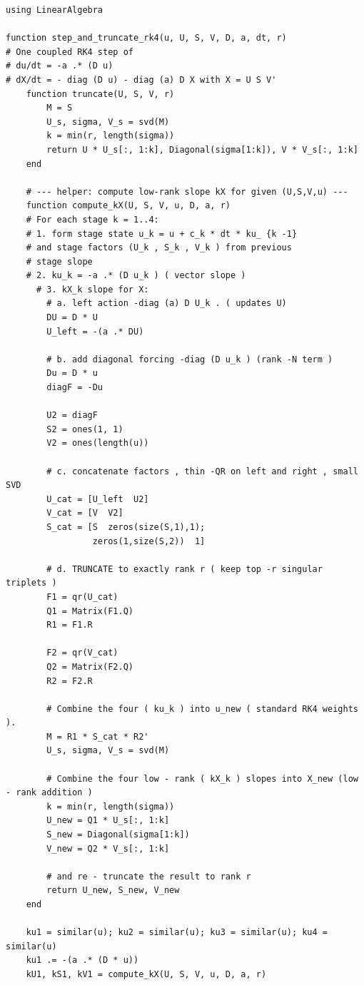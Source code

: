 \documentclass[11pt]{article}
\begin{document}
\begin{lstlisting}
using LinearAlgebra

function step_and_truncate_rk4(u, U, S, V, D, a, dt, r)
# One coupled RK4 step of
# du/dt = -a .* (D u)
# dX/dt = - diag (D u) - diag (a) D X with X = U S V'
    function truncate(U, S, V, r)
        M = S
        U_s, sigma, V_s = svd(M)
        k = min(r, length(sigma))
        return U * U_s[:, 1:k], Diagonal(sigma[1:k]), V * V_s[:, 1:k]
    end

    # --- helper: compute low-rank slope kX for given (U,S,V,u) ---
    function compute_kX(U, S, V, u, D, a, r)
    # For each stage k = 1..4:
    # 1. form stage state u_k = u + c_k * dt * ku_ {k -1}
    # and stage factors (U_k , S_k , V_k ) from previous
    # stage slope
    # 2. ku_k = -a .* (D u_k ) ( vector slope )
      # 3. kX_k slope for X:
        # a. left action -diag (a) D U_k . ( updates U)
        DU = D * U
        U_left = -(a .* DU)        

        # b. add diagonal forcing -diag (D u_k ) (rank -N term )
        Du = D * u                  
        diagF = -Du                 

        U2 = diagF                   
        S2 = ones(1, 1)         
        V2 = ones(length(u))      

        # c. concatenate factors , thin -QR on left and right , small SVD
        U_cat = [U_left  U2]         
        V_cat = [V  V2]              
        S_cat = [S  zeros(size(S,1),1);
                 zeros(1,size(S,2))  1]

        # d. TRUNCATE to exactly rank r ( keep top -r singular triplets )
        F1 = qr(U_cat)
        Q1 = Matrix(F1.Q)
        R1 = F1.R

        F2 = qr(V_cat)
        Q2 = Matrix(F2.Q)
        R2 = F2.R 

        # Combine the four ( ku_k ) into u_new ( standard RK4 weights ).
        M = R1 * S_cat * R2'
        U_s, sigma, V_s = svd(M)

        # Combine the four low - rank ( kX_k ) slopes into X_new (low - rank addition )
        k = min(r, length(sigma))
        U_new = Q1 * U_s[:, 1:k]
        S_new = Diagonal(sigma[1:k])
        V_new = Q2 * V_s[:, 1:k]

        # and re - truncate the result to rank r
        return U_new, S_new, V_new
    end

    ku1 = similar(u); ku2 = similar(u); ku3 = similar(u); ku4 = similar(u)
    ku1 .= -(a .* (D * u))
    kU1, kS1, kV1 = compute_kX(U, S, V, u, D, a, r)


\end{lstlisting}
\end{document}
